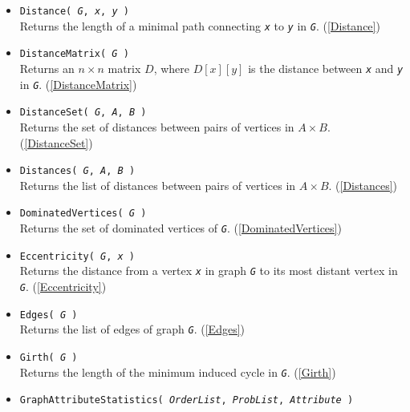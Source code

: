 \documentclass[a4paper,11pt]{report}
\begin{document}
{{\begin{itemize}
\item \texttt{Distance( \mbox{\texttt{\mdseries\slshape G}}, \mbox{\texttt{\mdseries\slshape x}}, \mbox{\texttt{\mdseries\slshape y}} )}\\
 Returns the length of a minimal path connecting \mbox{\texttt{\mdseries\slshape x}} to \mbox{\texttt{\mdseries\slshape y}} in \mbox{\texttt{\mdseries\slshape G}}. (\ref{Distance}) 
\item \texttt{DistanceMatrix( \mbox{\texttt{\mdseries\slshape G}} )}\\
 Returns an $n\times n$ matrix $D$, where $D[x][y]$ is the distance between \mbox{\texttt{\mdseries\slshape x}} and \mbox{\texttt{\mdseries\slshape y}} in \mbox{\texttt{\mdseries\slshape G}}. (\ref{DistanceMatrix}) 
\item \texttt{DistanceSet( \mbox{\texttt{\mdseries\slshape G}}, \mbox{\texttt{\mdseries\slshape A}}, \mbox{\texttt{\mdseries\slshape B}} )}\\
 Returns the set of distances between pairs of vertices in $A\times B$. (\ref{DistanceSet}) 
\item \texttt{Distances( \mbox{\texttt{\mdseries\slshape G}}, \mbox{\texttt{\mdseries\slshape A}}, \mbox{\texttt{\mdseries\slshape B}} )}\\
 Returns the list of distances between pairs of vertices in $A\times B$. (\ref{Distances}) 
\item \texttt{DominatedVertices( \mbox{\texttt{\mdseries\slshape G}} )}\\
 Returns the set of dominated vertices of \mbox{\texttt{\mdseries\slshape G}}. (\ref{DominatedVertices}) 
\item \texttt{Eccentricity( \mbox{\texttt{\mdseries\slshape G}}, \mbox{\texttt{\mdseries\slshape x}} )}\\
 Returns the distance from a vertex \mbox{\texttt{\mdseries\slshape x}} in graph \mbox{\texttt{\mdseries\slshape G}} to its most distant vertex in \mbox{\texttt{\mdseries\slshape G}}. (\ref{Eccentricity}) 
\item \texttt{Edges( \mbox{\texttt{\mdseries\slshape G}} )}\\
 Returns the list of edges of graph \mbox{\texttt{\mdseries\slshape G}}. (\ref{Edges}) 
\item \texttt{Girth( \mbox{\texttt{\mdseries\slshape G}} )}\\
 Returns the length of the minimum induced cycle in \mbox{\texttt{\mdseries\slshape G}}. (\ref{Girth}) 
\item \texttt{GraphAttributeStatistics( \mbox{\texttt{\mdseries\slshape OrderList}}, \mbox{\texttt{\mdseries\slshape ProbList}}, \mbox{\texttt{\mdseries\slshape Attribute}} )}\\

\end{itemize}}}
\end{document}
